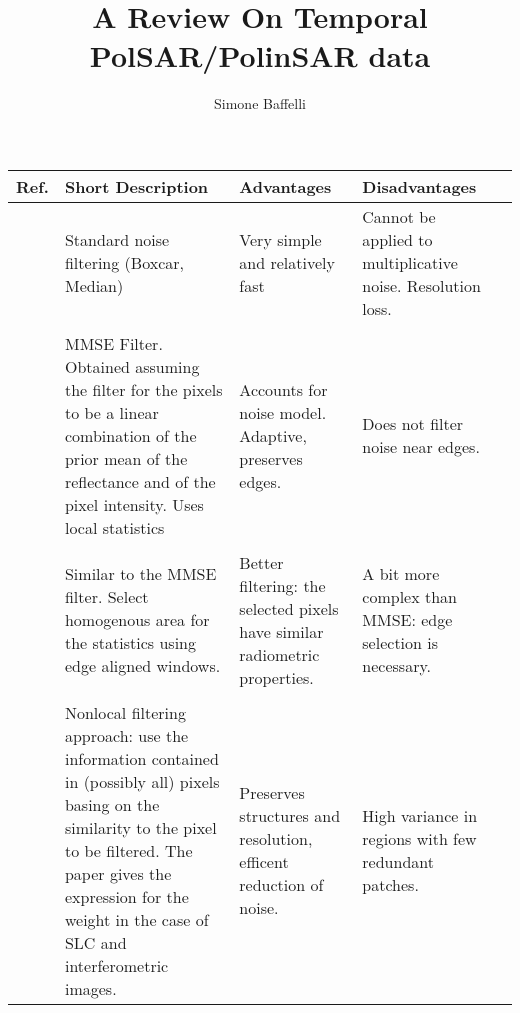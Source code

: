 \documentclass[11pt]{article}
\title{\textbf{A Review On Temporal PolSAR/PolinSAR data}}
\author{Simone Baffelli}
\date{}
\begin{document}
	\maketitle
\begin{longtable}{L{1cm}L{5cm}L{3cm}L{3cm}l}
	Ref. & Short Description & Advantages & Disadvantages\\
	\hline
	 &
	Standard noise filtering (Boxcar, Median) &
	Very simple and relatively fast &
	Cannot be applied to multiplicative noise. Resolution loss.\\
	\hline\\
	\cite{Lee1980}& 
	MMSE Filter. Obtained assuming the filter for the pixels to be a linear combination of the prior mean of the reflectance and of the pixel intensity. Uses local statistics&
	Accounts for noise model. Adaptive, preserves edges.&
	Does not filter noise near edges.\\
	\hline\\
	\cite{Lee1981}&
	Similar to the MMSE filter. Select homogenous area for the statistics using edge aligned windows.&
	Better filtering: the selected pixels have similar radiometric properties.&
	A bit more complex than MMSE: edge selection is necessary.\\
	\hline\\
	\cite{Deledalle2010}&
	Nonlocal filtering approach: use the information contained in (possibly all) pixels basing on the similarity to the pixel to be filtered. The paper gives the expression for the weight in the case of SLC and interferometric images.&
	Preserves structures and resolution, efficent reduction of noise.&
	High variance in regions with few redundant patches.
\end{longtable}


{}
\end{document}
